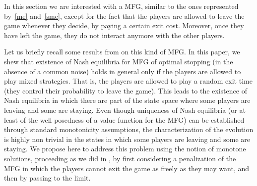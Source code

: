 \documentclass[10pt]{amsart}
\theoremstyle{definition}
\begin{document}
In this section we are interested with a MFG, similar to the ones represented by~\eqref{me} and~\eqref{sme}, except for the fact that the players are allowed to leave the game whenever they decide, by paying a certain exit cost. Moreover, once they have left the game, they do not interact anymore with the other players.

Let us briefly recall some results from \cite{bertucci2018optimal} on this kind of MFG. In this paper, we shew that existence of Nash equilibria for MFG of optimal stopping (in the absence of a common noise) holds in general only if the players are allowed to play mixed strategies. That is, the players are allowed to play a random exit time (\ie they control their probability to leave the game). This leads to the existence of Nash equilibria in which there are part of the state space where some players are leaving and some are staying. Even though uniqueness of Nash equilibria (or at least of the well posedness of a value function for the MFG) can be established through standard monotonicity assumptions, the characterization of the evolution is highly non trivial in the states in which some players are leaving and some are staying. We propose here to address this problem using the notion of monotone solutions, proceeding as we did in \cite{bertucci2018optimal}, by first considering a penalization of the MFG in which the players cannot exit the game as freely as they may want, and then by passing to the limit.
\end{document}

